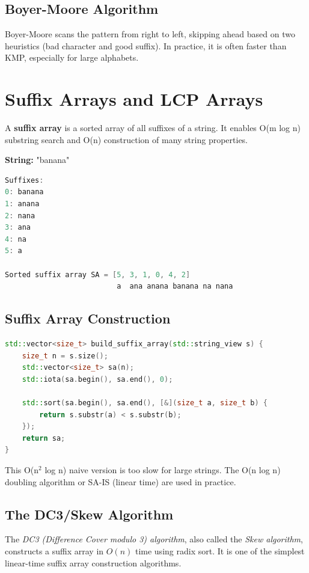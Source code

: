 \subsection{Boyer-Moore Algorithm}

Boyer-Moore scans the pattern from right to left, skipping ahead based on two heuristics (bad character and good suffix). In practice, it is often faster than KMP, especially for large alphabets.

\section{Suffix Arrays and LCP Arrays}

A \textbf{suffix array} is a sorted array of all suffixes of a string. It enables O(m log n) substring search and O(n) construction of many string properties.

\textbf{String:} "banana"

\begin{lstlisting}[language=Java]
Suffixes:
0: banana
1: anana
2: nana
3: ana
4: na
5: a

Sorted suffix array SA = [5, 3, 1, 0, 4, 2]
                          a  ana anana banana na nana
\end{lstlisting}

\subsection{Suffix Array Construction}

\begin{lstlisting}[language=C++]
std::vector<size_t> build_suffix_array(std::string_view s) {
    size_t n = s.size();
    std::vector<size_t> sa(n);
    std::iota(sa.begin(), sa.end(), 0);

    std::sort(sa.begin(), sa.end(), [&](size_t a, size_t b) {
        return s.substr(a) < s.substr(b);
    });
    return sa;
}
\end{lstlisting}

This O(n$^{2}$ log n) naive version is too slow for large strings. The O(n log n) doubling algorithm or SA-IS (linear time) are used in practice.

\subsection{The DC3/Skew Algorithm}

The \emph{DC3 (Difference Cover modulo 3) algorithm}, also called the \emph{Skew algorithm}, constructs a suffix array in $O(n)$ time using radix sort. It is one of the simplest linear-time suffix array construction algorithms.

